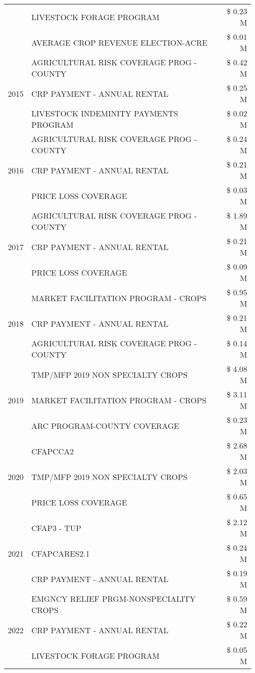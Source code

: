 \begin{tabular}{llr}
 & LIVESTOCK FORAGE PROGRAM & \$ 0.23 M \\
 & AVERAGE CROP REVENUE ELECTION-ACRE & \$ 0.01 M \\
\cline{1-3}
\multirow[t]{3}{*}{2015} & AGRICULTURAL RISK COVERAGE PROG - COUNTY & \$ 0.42 M \\
 & CRP PAYMENT - ANNUAL RENTAL & \$ 0.25 M \\
 & LIVESTOCK INDEMINITY PAYMENTS PROGRAM & \$ 0.02 M \\
\cline{1-3}
\multirow[t]{3}{*}{2016} & AGRICULTURAL RISK COVERAGE PROG - COUNTY & \$ 0.24 M \\
 & CRP PAYMENT - ANNUAL RENTAL & \$ 0.21 M \\
 & PRICE LOSS COVERAGE & \$ 0.03 M \\
\cline{1-3}
\multirow[t]{3}{*}{2017} & AGRICULTURAL RISK COVERAGE PROG - COUNTY & \$ 1.89 M \\
 & CRP PAYMENT - ANNUAL RENTAL & \$ 0.21 M \\
 & PRICE LOSS COVERAGE & \$ 0.09 M \\
\cline{1-3}
\multirow[t]{3}{*}{2018} & MARKET FACILITATION PROGRAM - CROPS & \$ 0.95 M \\
 & CRP PAYMENT - ANNUAL RENTAL & \$ 0.21 M \\
 & AGRICULTURAL RISK COVERAGE PROG - COUNTY & \$ 0.14 M \\
\cline{1-3}
\multirow[t]{3}{*}{2019} & TMP/MFP 2019 NON SPECIALTY CROPS & \$ 4.08 M \\
 & MARKET FACILITATION PROGRAM - CROPS & \$ 3.11 M \\
 & ARC PROGRAM-COUNTY COVERAGE & \$ 0.23 M \\
\cline{1-3}
\multirow[t]{3}{*}{2020} & CFAPCCA2 & \$ 2.68 M \\
 & TMP/MFP 2019 NON SPECIALTY CROPS & \$ 2.03 M \\
 & PRICE LOSS COVERAGE & \$ 0.65 M \\
\cline{1-3}
\multirow[t]{3}{*}{2021} & CFAP3 - TUP & \$ 2.12 M \\
 & CFAPCARES2.1 & \$ 0.24 M \\
 & CRP PAYMENT - ANNUAL RENTAL & \$ 0.19 M \\
\cline{1-3}
\multirow[t]{3}{*}{2022} & EMGNCY RELIEF PRGM-NONSPECIALITY CROPS & \$ 0.59 M \\
 & CRP PAYMENT - ANNUAL RENTAL & \$ 0.22 M \\
 & LIVESTOCK FORAGE PROGRAM & \$ 0.05 M \\
\cline{1-3}
\bottomrule
\end{tabular}
